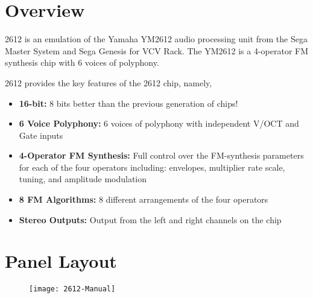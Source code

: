 \documentclass[12pt,a4paper]{article}
\begin{document}


\section{Overview}

2612 is an emulation of the Yamaha YM2612 audio processing unit from the Sega Master System and Sega Genesis for VCV Rack. The YM2612 is a 4-operator FM synthesis chip with 6 voices of polyphony.

2612 provides the key features of the 2612 chip, namely,
\begin{itemize}
  \item \textbf{16-bit:} 8 bits better than the previous generation of chips!
  \item \textbf{6 Voice Polyphony:} 6 voices of polyphony with independent V/OCT and Gate inputs
  \item \textbf{4-Operator FM Synthesis:} Full control over the FM-synthesis parameters for each of the four operators including: envelopes, multiplier rate scale, tuning, and amplitude modulation
  \item \textbf{8 FM Algorithms:} 8 different arrangements of the four operators
  \item \textbf{Stereo Outputs:} Output from the left and right channels on the chip
\end{itemize}


\clearpage
\section{Panel Layout}

\begin{figure}[!htp]
\centering
\texttt{[image: 2612-Manual]}
\end{figure}
\end{document}
